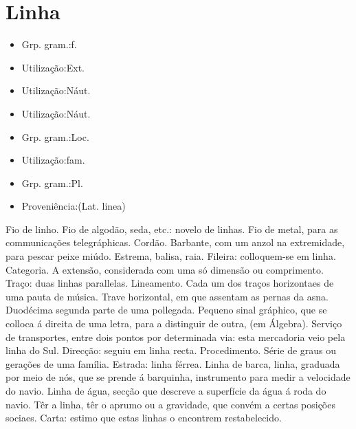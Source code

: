 \section{Linha}
\begin{itemize}
\item {Grp. gram.:f.}
\end{itemize}
\begin{itemize}
\item {Utilização:Ext.}
\end{itemize}
\begin{itemize}
\item {Utilização:Náut.}
\end{itemize}
\begin{itemize}
\item {Utilização:Náut.}
\end{itemize}
\begin{itemize}
\item {Grp. gram.:Loc.}
\end{itemize}
\begin{itemize}
\item {Utilização:fam.}
\end{itemize}
\begin{itemize}
\item {Grp. gram.:Pl.}
\end{itemize}
\begin{itemize}
\item {Proveniência:(Lat. \textunderscore linea\textunderscore )}
\end{itemize}
Fio de linho.
Fio de algodão, seda, etc.: \textunderscore novelo de linhas\textunderscore .
Fio de metal, para as communicações telegráphicas.
Cordão.
Barbante, com um anzol na extremidade, para pescar peixe miúdo.
Estrema, balisa, raia.
Fileira: \textunderscore colloquem-se em linha\textunderscore .
Categoria.
A extensão, considerada com uma só dimensão ou comprimento.
Traço: \textunderscore duas linhas parallelas\textunderscore .
Lineamento.
Cada um dos traços horizontaes de uma pauta de música.
Trave horizontal, em que assentam as pernas da asna.
Duodécima segunda parte de uma pollegada.
Pequeno sinal gráphico, que se colloca á direita de uma letra, para a distinguir de outra, (em Álgebra).
Serviço de transportes, entre dois pontos por determinada via: \textunderscore esta mercadoria veio pela linha do Sul\textunderscore .
Direcção: \textunderscore seguiu em linha recta\textunderscore .
Procedimento.
Série de graus ou gerações de uma família.
Estrada: \textunderscore linha férrea\textunderscore .
\textunderscore Linha de barca\textunderscore , linha, graduada por meio de nós, que se prende á barquinha, instrumento para medir a velocidade do navio.
\textunderscore Linha de água\textunderscore , secção que descreve a superfície da água á roda do navio.
\textunderscore Têr a linha\textunderscore , têr o aprumo ou a gravidade, que convém a certas posições sociaes.
Carta: \textunderscore estimo que estas linhas o encontrem restabelecido\textunderscore .
